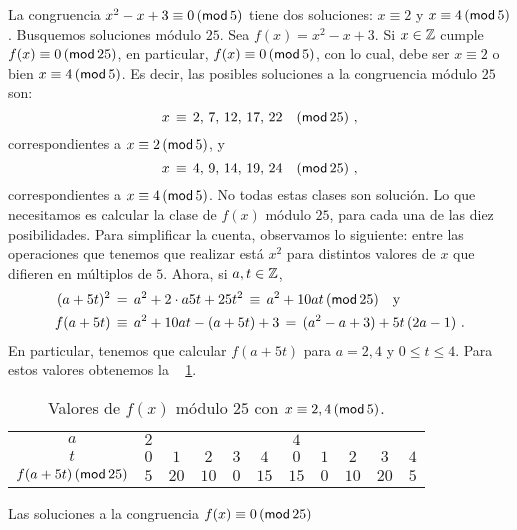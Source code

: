 \begin{ejemHensel}\label{ejem:hensel:cinco}
	La congruencia $x^2-x+3\equiv 0\tmodulo[5]$ tiene dos
	soluciones: $x\equiv 2$ y $x\equiv 4\tmodulo[5]$.
	Busquemos soluciones m\'odulo $25$. Sea $f(x)=x^2-x+3$.
	Si $x\in\Enteros$ cumple $f(x)\equiv 0\tmodulo[25]$,
	en particular, $f(x)\equiv 0\tmodulo[5]$, con lo cual,
	debe ser $x\equiv 2$ o bien $x\equiv 4\tmodulo[5]$.
	Es decir, las posibles soluciones a la congruencia
	m\'odulo $25$ son:
	\begin{displaymath}
		x\,\equiv\,2,\,7,\,12,\,17,\,22\modulo[25]
		\dispcomma
	\end{displaymath}
	correspondientes a $x\equiv 2\tmodulo[5]$, y
	\begin{displaymath}
		x\,\equiv\,4,\,9,\,14,\,19,\,24\modulo[25]
		\dispcomma
	\end{displaymath}
	correspondientes a $x\equiv 4\tmodulo[5]$.
	No todas estas clases son soluci\'on.
	Lo que necesitamos es calcular la clase de $f(x)$
	m\'odulo $25$, para cada una de las diez posibilidades.
	Para simplificar la cuenta, observamos lo siguiente:
	entre las operaciones que tenemos que realizar est\'a
	$x^2$ para distintos valores de $x$ que difieren en
	m\'ultiplos de $5$. Ahora, si $a,t\in\Enteros$,
	\begin{displaymath}
		\begin{aligned}
			(a+5t)^2 & \,=\,a^2+2\cdot a5t+25t^2
				\,\equiv\,a^2+10at\tmodulo[25]
				\dispand \\
			f(a+5t) & \,\equiv\,
				a^2+10at-(a+5t)+3 \,=\,
				(a^2-a+3) + 5t\,(2a-1)
			\dispstop
		\end{aligned}
	\end{displaymath}
	En particular, tenemos que calcular $f(a+5t)$ para
	$a=2,4$ y $0\leq t\leq 4$.
	Para estos valores obtenemos la \tablename~%
	\ref{tab:hensel:cinco}.
	\begin{table}
		\centering
		\begin{tabular}{c|ccccc|ccccc}
			$a$ & $2$ & & & &
				& $4$ & & & & \\
			$t$ & $0$ & $1$ & $2$ & $3$ & $4$
				& $0$ & $1$ & $2$ & $3$ & $4$ \\
			$f(a+5t)\tmodulo[25]$ & $5$ & $20$ & $10$ & $0$ & $15$
				& $15$ & $0$ & $10$ & $20$ & $5$
		\end{tabular}
		\caption{
			Valores de $f(x)$ m\'odulo $25$ con
			$x\equiv 2,4\tmodulo[5]$.
		}\label{tab:hensel:cinco}
	\end{table}
	Las soluciones a la congruencia $f(x)\equiv 0\tmodulo[25]$

\end{ejemHensel}
